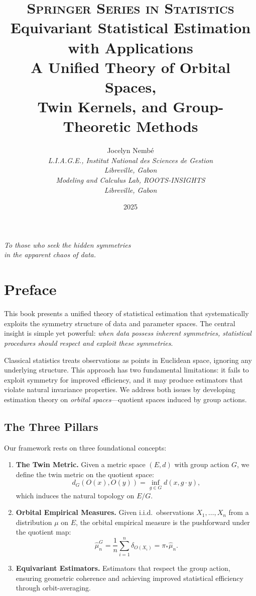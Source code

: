 \documentclass[11pt,twoside,openright]{book}
\title{
\vspace{-2cm}
{\LARGE\textsc{Springer Series in Statistics}}\\[2cm]
{\Huge\textbf{Equivariant Statistical Estimation}}\\[0.5cm]
{\Huge\textbf{with Applications}}\\[1.5cm]
{\Large A Unified Theory of Orbital Spaces,}\\[0.3cm]
{\Large Twin Kernels, and Group-Theoretic Methods}\\[3cm]
}
\author{
{\Large Jocelyn Nembé}\\[1cm]
\textit{L.I.A.G.E., Institut National des Sciences de Gestion}\\
\textit{Libreville, Gabon}\\[0.5cm]
\textit{Modeling and Calculus Lab, ROOTS-INSIGHTS}\\
\textit{Libreville, Gabon}
}
\date{2025}
\theoremstyle{plain}
\theoremstyle{definition}
\theoremstyle{remark}
\begin{document}
\frontmatter

\maketitle

\newpage
\thispagestyle{empty}
\vspace*{5cm}
\begin{flushright}
\textit{To those who seek the hidden symmetries\\
in the apparent chaos of data.}
\end{flushright}

\chapter{Preface}

This book presents a unified theory of statistical estimation that systematically exploits the symmetry structure of data and parameter spaces. The central insight is simple yet powerful: \emph{when data possess inherent symmetries, statistical procedures should respect and exploit these symmetries}.

Classical statistics treats observations as points in Euclidean space, ignoring any underlying structure. This approach has two fundamental limitations: it fails to exploit symmetry for improved efficiency, and it may produce estimators that violate natural invariance properties. We address both issues by developing estimation theory on \emph{orbital spaces}---quotient spaces induced by group actions.

\section*{The Three Pillars}

Our framework rests on three foundational concepts:

\begin{enumerate}
\item \textbf{The Twin Metric.} Given a metric space $(E, d)$ with group action $G$, we define the twin metric on the quotient space:
\[
d_G(O(x), O(y)) = \inf_{g \in G} d(x, g\cdot y),
\]
which induces the natural topology on $E/G$.

\item \textbf{Orbital Empirical Measures.} Given i.i.d.\ observations $X_1, \ldots, X_n$ from a distribution $\mu$ on $E$, the orbital empirical measure is the pushforward under the quotient map:
\[
\hat{\mu}_n^G = \frac{1}{n} \sum_{i=1}^n \delta_{O(X_i)} = \pi_* \hat{\mu}_n.
\]

\item \textbf{Equivariant Estimators.} Estimators that respect the group action, ensuring geometric coherence and achieving improved statistical efficiency through orbit-averaging.
\end{enumerate}
\end{document}
